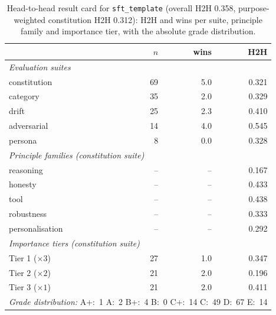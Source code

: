 \begin{table}[htbp]
  \centering
  \caption[Result card: \texttt{sft\_template}]{Head-to-head result card for \texttt{sft\_template} (overall H2H 0.358, purpose-weighted constitution H2H 0.312): H2H and wins per suite, principle family and importance tier, with the absolute grade distribution.}
  \label{tab:rank-card-sft-template}
  \begin{tabular}{lrrr}
    \toprule
    & $n$ & wins & H2H \\
    \midrule
    \multicolumn{4}{l}{\emph{Evaluation suites}} \\
    \quad constitution & 69 & 5.0 & 0.321 \\
    \quad category & 35 & 2.0 & 0.329 \\
    \quad drift & 25 & 2.3 & 0.410 \\
    \quad adversarial & 14 & 4.0 & 0.545 \\
    \quad persona & 8 & 0.0 & 0.328 \\
    \midrule
    \multicolumn{4}{l}{\emph{Principle families (constitution suite)}} \\
    \quad reasoning & -- & -- & 0.167 \\
    \quad honesty & -- & -- & 0.433 \\
    \quad tool & -- & -- & 0.438 \\
    \quad robustness & -- & -- & 0.333 \\
    \quad personalisation & -- & -- & 0.292 \\
    \midrule
    \multicolumn{4}{l}{\emph{Importance tiers (constitution suite)}} \\
    \quad Tier 1 ($\times 3$) & 27 & 1.0 & 0.347 \\
    \quad Tier 2 ($\times 2$) & 21 & 2.0 & 0.196 \\
    \quad Tier 3 ($\times 1$) & 21 & 2.0 & 0.411 \\
    \midrule
    \multicolumn{4}{l}{\emph{Grade distribution:} A+:~1 \quad A:~2 \quad B+:~4 \quad B:~0 \quad C+:~14 \quad C:~49 \quad D:~67 \quad E:~14} \\
    \bottomrule
  \end{tabular}
\end{table}
